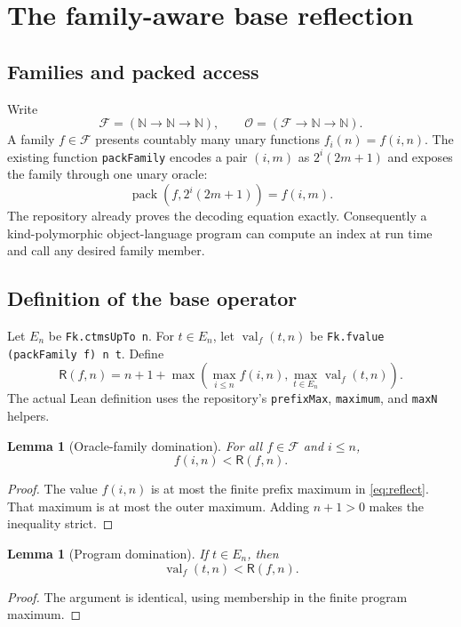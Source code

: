 \documentclass[11pt,oneside]{article}
\newtheorem{lemma}[theorem]{Lemma}
\theoremstyle{definition}
\newcommand{\Nat}{\mathbb N}
\newcommand{\Fam}{\mathcal F}
\newcommand{\Op}{\mathcal O}
\newcommand{\Reflect}{\mathsf R}
\newcommand{\code}[1]{\texttt{#1}}
\begin{document}
\section{The family-aware base reflection}

\subsection{Families and packed access}

Write
\[
 \Fam=(\Nat\to\Nat\to\Nat),\qquad
 \Op=(\Fam\to\Nat\to\Nat).
\]
A family $f\in\Fam$ presents countably many unary functions $f_i(n)=f(i,n)$.
The existing function \code{packFamily} encodes a pair $(i,m)$ as
$2^i(2m+1)$ and exposes the family through one unary oracle:
\[
 \operatorname{pack}(f,2^i(2m+1))=f(i,m).
\]
The repository already proves the decoding equation exactly.  Consequently a
kind-polymorphic object-language program can compute an index at run time and
call any desired family member.

\subsection{Definition of the base operator}

Let $E_n$ be \code{Fk.ctmsUpTo n}.  For $t\in E_n$, let
$\operatorname{val}_f(t,n)$ be \code{Fk.fvalue (packFamily f) n t}.  Define
\begin{equation}\label{eq:reflect}
 \Reflect(f,n)=n+1+
   \max\left(
     \max_{i\le n} f(i,n),
     \max_{t\in E_n}\operatorname{val}_f(t,n)
   \right).
\end{equation}
The actual Lean definition uses the repository's \code{prefixMax},
\code{maximum}, and \code{maxN} helpers.

\begin{lemma}[Oracle-family domination]\label{lem:reflect-oracle}
For all $f\in\Fam$ and $i\le n$,
\[
 f(i,n)<\Reflect(f,n).
\]
\end{lemma}
\begin{proof}
The value $f(i,n)$ is at most the finite prefix maximum in
\cref{eq:reflect}.  That maximum is at most the outer maximum.  Adding
$n+1>0$ makes the inequality strict.
\end{proof}

\begin{lemma}[Program domination]\label{lem:reflect-program}
If $t\in E_n$, then
\[
 \operatorname{val}_f(t,n)<\Reflect(f,n).
\]
\end{lemma}
\begin{proof}
The argument is identical, using membership in the finite program maximum.
\end{proof}
\end{document}
